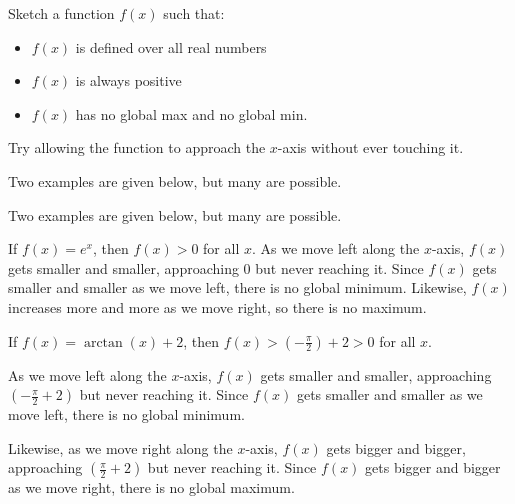 \begin{Mquestion}
Sketch a function $f(x)$ such that:
\begin{itemize}
\item $f(x)$ is defined over all real numbers
\item $f(x)$ is always positive
\item $f(x)$ has no global max and no global min.
\end{itemize}
\end{Mquestion}
\begin{hint}
Try allowing the function to approach the $x$-axis without ever touching it.
\end{hint}
\begin{answer}
Two examples are given below, but many are possible.
\begin{center}

\end{center}
\end{answer}
\begin{solution}
Two examples are given below, but many are possible.
\begin{center}
\end{center}
If $f(x)=e^x$, then $f(x) > 0$ for all $x$. As we move left along the $x$-axis, $f(x)$ gets smaller and smaller, approaching 0 but never reaching it. Since $f(x)$ gets smaller and smaller as we move left, there is no global minimum. Likewise, $f(x)$ increases more and more as we move right, so there is no maximum.
\begin{center}
\end{center}
If $f(x)=\arctan(x)+2$, then $f(x) >\left(-\frac{\pi}{2}\right)+2>0$ for all $x$.

As we move left along the $x$-axis, $f(x)$ gets smaller and smaller, approaching $\left(-\frac{\pi}{2}+2\right)$ but never reaching it. Since $f(x)$ gets smaller and smaller as we move left, there is no global minimum.

 Likewise, as we move right along the $x$-axis,
$f(x)$ gets bigger and bigger, approaching $\left(\frac{\pi}{2}+2\right)$ but never reaching it. Since $f(x)$ gets bigger and bigger as we move right, there is no global maximum.
\end{solution}


